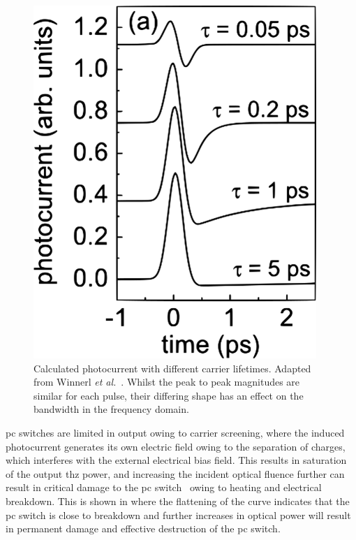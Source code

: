 \begin{figure}[t]
    \centering
    \includegraphics{Figures/Misc/Theory/PCsCarrierLifetime.png}
    \captionsetup{font = footnotesize, justification = centering}
    \caption[Calculated Photocurrent with Different Carrier Lifetimes]{Calculated photocurrent with different carrier lifetimes. Adapted from Winnerl \textit{et al.}~\cite{Winnerl2008}. Whilst the peak to peak magnitudes are similar for each pulse, their differing shape has an effect on the bandwidth in the frequency domain.}
    \label{fig:PCCarrierLifetime}
\end{figure}

\acrshort{pc} switches are limited in output owing to carrier screening, where the induced photocurrent generates its own electric field owing to the separation of charges, which interferes with the external electrical bias field. This results in saturation of the output \acrshort{thz} power, and increasing the incident optical fluence further can result in critical damage to the \acrshort{pc} switch~\cite{Kim2005} owing to heating and electrical breakdown. This is shown in  where the flattening of the curve indicates that the \acrshort{pc} switch is close to breakdown and further increases in optical power will result in permanent damage and effective destruction of the \acrshort{pc} switch.


